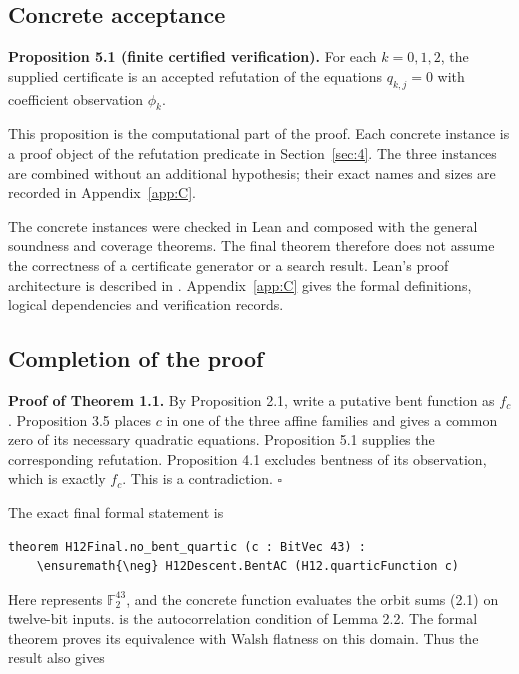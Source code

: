 \documentclass[pdflatex,sn-mathphys-num]{sn-jnl}
\begin{document}
\subsection{Concrete acceptance}\label{subsec:5:1}

\textbf{Proposition 5.1 (finite certified verification).} For each $k=0,1,2$, the supplied certificate is an accepted refutation of the equations $q_{k,j}=0$ with coefficient observation $\phi_k$.

This proposition is the computational part of the proof. Each concrete instance is a proof object of the refutation predicate in Section~\ref{sec:4}. The three instances are combined without an additional hypothesis; their exact names and sizes are recorded in Appendix~\ref{app:C}.

The concrete instances were checked in Lean and composed with the general soundness and coverage theorems. The final theorem therefore does not assume the correctness of a certificate generator or a search result. Lean's proof architecture is described in \cite{ref11}. Appendix~\ref{app:C} gives the formal definitions, logical dependencies and verification records.

\subsection{Completion of the proof}\label{subsec:5:2}

\textbf{Proof of Theorem 1.1.} By Proposition 2.1, write a putative bent function as $f_c$. Proposition 3.5 places $c$ in one of the three affine families and gives a common zero of its necessary quadratic equations. Proposition 5.1 supplies the corresponding refutation. Proposition 4.1 excludes bentness of its observation, which is exactly $f_c$. This is a contradiction. \hfill$\square$

The exact final formal statement is

\begin{Verbatim}[fontsize=\scriptsize,breaklines=true,breakanywhere=true,commandchars=\\\{\}]
theorem H12Final.no_bent_quartic (c : BitVec 43) :
    \ensuremath{\neg} H12Descent.BentAC (H12.quarticFunction c)
\end{Verbatim}

Here  represents $\mathbb F_2^{43}$, and the concrete function evaluates the orbit sums (2.1) on twelve-bit inputs.  is the autocorrelation condition of Lemma 2.2. The formal theorem  proves its equivalence with Walsh flatness on this domain. Thus the result also gives
\end{document}
